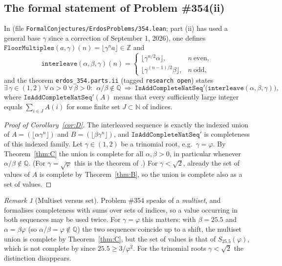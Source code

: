 \documentclass[11pt]{amsart}
\theoremstyle{definition}
\theoremstyle{remark}
\newtheorem{remark}[lemma]{Remark}
\newcommand{\N}{\mathbb{N}}
\newcommand{\Z}{\mathbb{Z}}
\newcommand{\Q}{\mathbb{Q}}
\newcommand{\fl}[1]{\lfloor #1\rfloor}
\begin{document}
\subsection*{The formal statement of Problem \#354(ii)}
In \cite{FC} (file \nolinkurl{FormalConjectures/ErdosProblems/354.lean}; part (ii) has used
a general base $\gamma$ since a correction of September 1, 2026), one defines
$\mathtt{FloorMultiples}(a,\gamma)(n)=\fl{\gamma^na}\in\Z$ and
\[
  \mathtt{interleave}(\alpha,\beta,\gamma)(n)=
  \begin{cases}\fl{\gamma^{n/2}\alpha}, & n\ \text{even},\\
  \fl{\gamma^{(n-1)/2}\beta}, & n\ \text{odd},\end{cases}
\]
and the theorem \texttt{erdos\_354.parts.ii} (tagged \texttt{research open}) states
\[
  \exists\,\gamma\in(1,2)\ \forall\,\alpha>0\ \forall\,\beta>0:\ \ \alpha/\beta\notin\Q\
  \Longrightarrow\ \mathtt{IsAddCompleteNatSeq'}\bigl(\mathtt{interleave}(\alpha,\beta,\gamma)\bigr),
\]
where $\mathtt{IsAddCompleteNatSeq'}(A)$ means that every sufficiently large integer equals
$\sum_{i\in J}A(i)$ for some finite set $J\subset\N$ of indices.

\begin{proof}[Proof of Corollary~\ref{cor:D}]
The interleaved sequence is exactly the indexed union of $A=(\fl{\alpha\gamma^n})$ and
$B=(\fl{\beta\gamma^n})$, and $\mathtt{IsAddCompleteNatSeq'}$ is completeness of this indexed
family. Let $\gamma\in(1,2)$ be a trinomial root, e.g.\ $\gamma=\varphi$. By Theorem~\ref{thm:C}
the union is complete for all $\alpha,\beta>0$, in particular whenever $\alpha/\beta\notin\Q$.
(For $\gamma=\sqrt\varphi$ this is the theorem of \cite{Kit26}.) For $\gamma<\sqrt2$, already the set of values of $A$ is
complete by Theorem~\ref{thm:B}, so the union is complete also as a set of values.
\end{proof}

\begin{remark}[Multiset versus set]\label{rem:multiset}
Problem \#354 speaks of a \emph{multiset}, and \cite{FC} formalises completeness with sums over
sets of indices, so a value occurring in both sequences may be used twice. For $\gamma=\varphi$
this matters: with $\beta=25.5$ and $\alpha=\beta\varphi$ (so $\alpha/\beta=\varphi\notin\Q$) the
two sequences coincide up to a shift, the multiset union is complete by Theorem~\ref{thm:C},
but the set of values is that of $S_{25.5}(\varphi)$, which is not complete by \cite{vD26}
since $25.5\ge3/\varphi^2$. For the trinomial roots $\gamma<\sqrt2$ the distinction disappears.
\end{remark}
\end{document}
